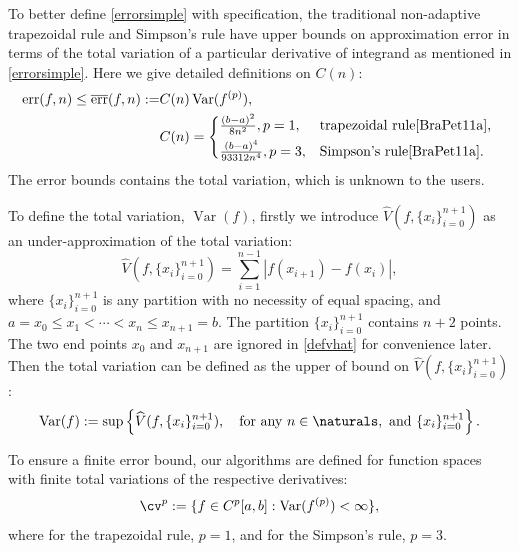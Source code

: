 \documentclass{iitthesis}
\DeclareMathOperator{\Var}{Var}
\theoremstyle{definition}
\theoremstyle{remark}
\begin{document}
To better define \eqref{errorsimple} with specification, the traditional non-adaptive trapezoidal rule and Simpson's rule have upper bounds on approximation error in terms of the total variation of a particular derivative of integrand as mentioned in \eqref{errorsimple}. Here we give detailed definitions on $C(n)$:
\begin{align}\label{errorbound}
    \text{err}(f,n)\le\overline{\text{err}}(f,n):=&C(n)\Var(f^{(p)}),\\
    \nonumber&C(n)=
    \begin{cases*}
           \frac{(b-a)^2}{8n^2}, p=1,  & \mbox{trapezoidal rule}\cite[(7.15)]{BraPet11a}, \\
           \frac{(b-a)^4}{93312n^4}, p=3, & \mbox{Simpson's rule}\cite[(p.231)]{BraPet11a}.
    \end{cases*}
\end{align}
The error bounds contains the total variation, which is unknown to the users.

To define the total variation, $\Var(f)$, firstly we introduce $\widehat{V}(f,\{x_i\}_{i=0}^{n+1})$ as an under-approximation of the total variation:
\begin{equation}\label{defvhat}
    \widehat{V}(f,\{x_i\}_{i=0}^{n+1})=\sum_{i=1}^{n-1}|f(x_{i+1})-f(x_{i})|,
\end{equation}
where $\{x_i\}_{i=0}^{n+1}$ is any partition with no necessity of equal spacing, and $a=x_{0}\leq x_{1}<\cdots<x_{n}\leq x_{n+1}=b$.
The partition $\{x_i\}_{i=0}^{n+1}$ contains $n+2$ points. The two end points $x_0$ and $x_{n+1}$ are ignored in \eqref{defvhat} for convenience later.
Then the total variation can be defined as the upper of bound on $\widehat{V}(f,\{x_i\}_{i=0}^{n+1})$:
\begin{equation}\label{defvar}
  \Var(f) := \sup \left\{\widehat{V}(f,\{x_i\}_{i=0}^{n+1}), \quad \text{for any }n \in \naturals, \text{ and } \{x_i\}_{i=0}^{n+1}\right\}.
\end{equation}

To ensure a finite error bound, our algorithms are defined for function spaces with finite total variations of the respective derivatives:
\begin{equation}\label{defspace}
 \cv^{p}:=\{f\in C^{p}[a,b]: \Var(f^{(p)}) < \infty \},
\end{equation}
where for the trapezoidal rule, $p=1$, and for the Simpson's rule, $p=3$.
\end{document}
